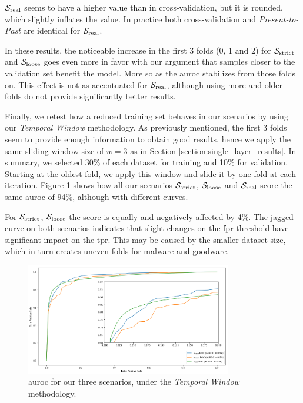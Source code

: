 $\mathcal{S}_{\mathrm{real}}$ seems to have a higher value than in cross-validation, but it is rounded, which slightly inflates the value.
In practice both cross-validation and \textit{Present-to-Past} are identical for $\mathcal{S}_{\mathrm{real}}$.

In these results, the noticeable increase in the first 3 folds (0, 1 and 2) for $\mathcal{S}_{\mathrm{strict}}$ and $\mathcal{S}_{\mathrm{loose}}$ goes even more in favor with our argument that samples closer to the validation set benefit the model.
More so as the \gls{auroc} stabilizes from those folds on.
This effect is not as accentuated for $\mathcal{S}_{\mathrm{real}}$, although using more and older folds do not provide significantly better results.

\medskip

Finally, we retest how a reduced training set behaves in our scenarios by using our \textit{Temporal Window} methodology.
As previously mentioned, the first 3 folds seem to provide enough information to obtain good results, hence we apply the same sliding window size of $w=3$ as in Section \ref{section:single_layer_results}.
In summary, we selected 30\% of each dataset for training and 10\% for validation.
Starting at the oldest fold, we apply this window and slide it by one fold at each iteration.
Figure \ref{fig:slidingwindow_modified} shows how all our scenarios $\mathcal{S}_{\mathrm{strict}}$, $\mathcal{S}_{\mathrm{loose}}$ and $\mathcal{S}_{\mathrm{real}}$ score the same \gls{auroc} of 94\%, although with different curves.

For $\mathcal{S}_{\mathrm{strict}}$, $\mathcal{S}_{\mathrm{loose}}$ the score is equally and negatively affected by 4\%.
The jagged curve on both scenarios indicates that slight changes on the \gls{fpr} threshold have significant impact on the \gls{tpr}.
This may be caused by the smaller dataset size, which in turn creates uneven folds for malware and goodware.

\begin{figure}[!h]
	\centering
	\includegraphics[width=0.8\textwidth]{Figures/slidingwindow_improved.png}
	\caption[Multi layer results for dynamic features in \textit{Temporal Window}.]{\gls{auroc} for our three scenarios, under the \textit{Temporal Window} methodology.}
	\label{fig:slidingwindow_modified}
\end{figure}

